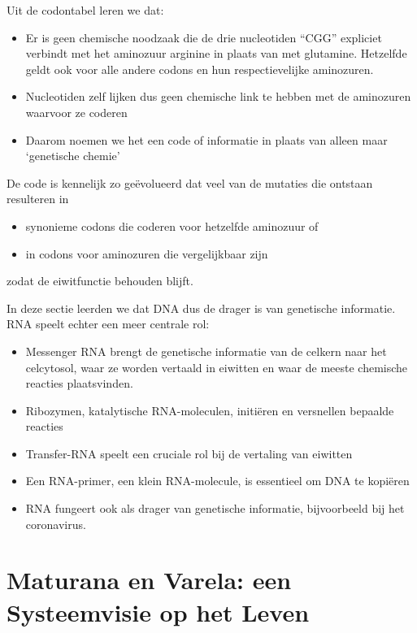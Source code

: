 \documentclass[
  11pt,
]{book}
\providecommand{\tightlist}{%
  \setlength{\itemsep}{0pt}\setlength{\parskip}{0pt}}
\begin{document}
Uit de codontabel leren we dat:

\begin{itemize}
\item
  Er is geen chemische noodzaak die de drie nucleotiden ``CGG'' expliciet verbindt met het aminozuur arginine in plaats van met glutamine. Hetzelfde geldt ook voor alle andere codons en hun respectievelijke aminozuren.
\item
  Nucleotiden zelf lijken dus geen chemische link te hebben met de aminozuren waarvoor ze coderen
\item
  Daarom noemen we het een code of informatie in plaats van alleen maar `genetische chemie'
\end{itemize}

De code is kennelijk zo geëvolueerd dat veel van de mutaties die ontstaan resulteren in

\begin{itemize}
\tightlist
\item
  synonieme codons die coderen voor hetzelfde aminozuur of
\item
  in codons voor aminozuren die vergelijkbaar zijn
\end{itemize}

zodat de eiwitfunctie behouden blijft.

In deze sectie leerden we dat DNA dus de drager is van genetische informatie. RNA speelt echter een meer centrale rol:

\begin{itemize}
\item
  Messenger RNA brengt de genetische informatie van de celkern naar het celcytosol, waar ze worden vertaald in eiwitten en waar de meeste chemische reacties plaatsvinden.
\item
  Ribozymen, katalytische RNA-moleculen, initiëren en versnellen bepaalde reacties
\item
  Transfer-RNA speelt een cruciale rol bij de vertaling van eiwitten
\item
  Een RNA-primer, een klein RNA-molecule, is essentieel om DNA te kopiëren
\item
  RNA fungeert ook als drager van genetische informatie, bijvoorbeeld bij het coronavirus.
\end{itemize}

\newpage

\hypertarget{maturanaVarela}{%
\section{Maturana en Varela: een Systeemvisie op het Leven}\label{maturanaVarela}}
\end{document}
